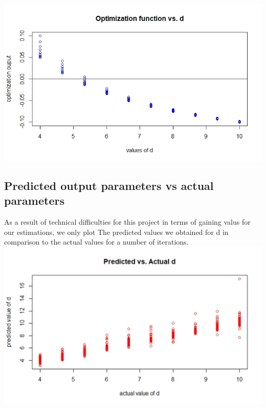 \documentclass{article}
\begin{document}
\includegraphics[scale=0.4]{OPd}

\subsection{Predicted output parameters vs actual parameters}\hfill\break
\hfill\break
As a result of technical difficulties for this project in terms of gaining valus for our estimations, we only plot The predicted values we obtained for d in comparison to the actual values for a number of iterations. 
\hfill\break
\includegraphics[scale=0.5]{Picture1}
\end{document}
